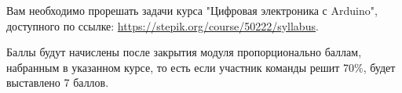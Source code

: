 
Вам необходимо прорешать задачи курса "Цифровая электроника с Arduino"{}, доступного по ссылке: \url{https://stepik.org/course/50222/syllabus}.

\markSection

Баллы будут начислены после закрытия модуля пропорционально баллам, набранным в указанном курсе, то есть если участник команды решит 70\%, будет выставлено 7 баллов. 
